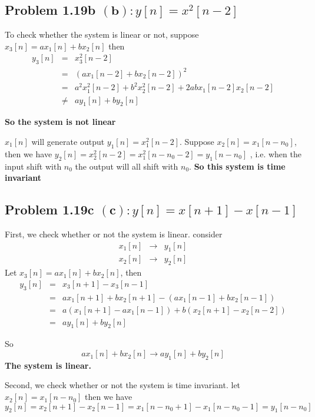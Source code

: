 \documentclass[koma,a4paper,utopia,12pt,listings-color,microtype,paralist,colorlinks,urlcolor=red]{org-article}
\begin{document}
\subsection{Problem 1.19b  \(\mathbf{(b)}: y[n]= x^{2}[n-2]\)}
\label{sec:org54f2d2d}

To check whether the system is linear or not, suppose \(x_{3}[n] = ax_{1}[n] +
bx_{2}[n]\)  then
\begin{eqnarray*}
y_{3}[n] &=& x_{3}^{2}[n-2] \\
&=& ( ax_{1}[n-2] + bx_{2}[n-2] )^{2} \\
&=& a^{2} x_{1}^{2}[n-2] + b^{2}x_{2}^{2}[n-2] + 2abx_{1}[n-2]x_{2}[n-2] \\
&\neq& ay_{1}[n] + by_{2}[n]
\end{eqnarray*}

\textbf{So the system is not linear}

\(x_{1}[n]\) will generate output \(y_{1}[n] = x_{1}^{2}[n-2]\). Suppose
\(x_{2}[n] = x_{1}[n-n_{0}]\), then we have \(y_{2}[n] = x_{2}^{2}[n-2] =
 x_{1}^{2}[n-n_{0}-2] = y_{1}[n-n_{0}]\) , i.e. when the input shift with
\(n_{0}\) the output will all shift with \(n_{0}\). \textbf{So this system is time invariant}
\subsection{Problem 1.19c \(\mathbf{(c)}: y[n]= x[n+1] - x[n-1]\)}
\label{sec:org2f58a2e}


First, we check whether or not the system is linear. consider
\begin{eqnarray*}
x_{1}[n]&\to& y_{1}[n] \\
x_{2}[n]&\to& y_{2}[n]
\end{eqnarray*}
Let \(x_{3}[n] = ax_{1}[n] + bx_{2}[n]\), then
\begin{eqnarray*}
y_{3}[n]&=& x_{3}[n+1] - x_{3}[n-1] \\
&=& ax_{1}[n+1] + bx_{2}[n+1] - ( ax_{1}[n-1] + bx_{2}[n-1] ) \\
&=& a(x_{1}[n+1] - ax_{1}[n-1]) + b(x_{2}[n+1] - x_{2}[n-2]) \\
&=& a y_{1}[n] + by_{2}[n]
\end{eqnarray*}

So
\begin{equation*}
ax_{1}[n] + bx_{2}[n] \to ay_{1}[n] + by_{2}[n]
\end{equation*}
\textbf{The system is linear.}

Second, we check whether or not the system is time invariant. let \(x_{2}[n] =
x_{1}[n-n_{0}]\) then
we have
\begin{equation*}
y_{2}[n] = x_{2}[n+1] - x_{2}[n-1] = x_{1}[n-n_{0} + 1] - x_{1}[n-n_{0} -1] = y_{1}[n-n_{0}]
\end{equation*}
\end{document}

